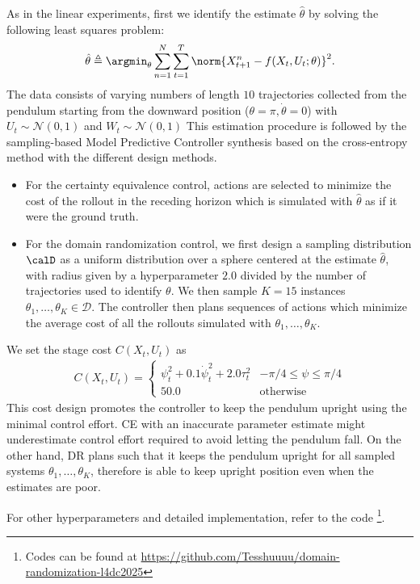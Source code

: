 As in the linear experiments, first we identify the estimate $\hat\theta$ by solving the following least squares problem:
\begin{align*}
    \hat\theta \triangleq \argmin_\theta \sum_{n=1}^N\sum_{t=1}^T\norm{X_{t+1}^n - f(X_t, U_t; \theta)}^2.
\end{align*}
The data consists of varying numbers of length $10$ trajectories collected from the pendulum starting from the downward position ($\theta = \pi, \dot \theta =0$) with $U_t\sim\mathcal{N}(0, 1)$ and $W_t\sim\mathcal{N}(0, 1)$ 
This estimation procedure is followed by the sampling-based Model Predictive Controller synthesis based on the cross-entropy method \citep{botev2013cross} with the different design methods.
\begin{itemize}
    \item For the certainty equivalence control, actions are selected to  minimize the cost of the rollout in the receding horizon which is simulated with $\hat\theta$ as if it were the ground truth.
    \item For the domain randomization control, we first design a sampling distribution $\calD$ as a uniform distribution over a sphere centered at the estimate $\hat \theta$, with radius given by a hyperparameter $2.0$ divided by the number of trajectories used to identify $\theta$. We then sample $K=15$ instances $\theta_1, \dots, \theta_{K} \in\mathcal{D}$. The controller then plans sequences of actions which minimize the average cost of all the rollouts simulated with $\theta_1, \dots, \theta_{K}$. 
\end{itemize}
We set the stage cost $C(X_t, U_t)$ as
\begin{align*}
    C(X_t, U_t) = \left\{\begin{array}{ll}
        \psi_t^2 + 0.1\dot\psi_t^2 + 2.0\tau_t^2 & -\pi/4 \leq \psi \leq \pi/4 \\
        50.0 & \text{otherwise}
    \end{array}\right.
\end{align*}
This cost design promotes the controller to keep the pendulum upright using the minimal control effort. CE with an inaccurate parameter estimate might underestimate control effort required to avoid letting the pendulum fall.
On the other hand, DR plans such that it keeps the pendulum upright for all sampled systems $\theta_1, \dots, \theta_K$, therefore is able to keep upright position even when the estimates are poor.

For other hyperparameters and detailed implementation, refer to the code \footnote{Codes can be found at \url{https://github.com/Tesshuuuu/domain-randomization-l4dc2025}}.


